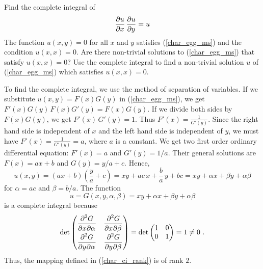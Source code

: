 \begin{egg}
Find the complete integral of
\begin{equation} \label{char_egg_ms}
\pdydx{u}{x}\,\pdydx{u}{y} = u
\end{equation}
The function $u(x,y)=0$ for all $x$ and $y$ satisfies
(\ref{char_egg_ms}) and the condition $u(x,x)=0$.  Are there
non-trivial solutions to (\ref{char_egg_ms}) that satisfy $u(x,x)=0$?
Use the complete integral to find a non-trivial solution $u$ of
(\ref{char_egg_ms}) which satisfies $u(x,x) = 0$.

To find the complete integral, we use the method of separation of
variables.  If we substitute $u(x,y) = F(x)G(y)$ in
(\ref{char_egg_ms}), we get $F'(x)G(y)\, F(x)G'(y) = F(x)G(y)$.  If
we divide both sides by $F(x)G(y)$, we get $F'(x) \, G'(y) = 1$. Thus
$\displaystyle F'(x) = \frac{1}{G'(y)}$.  Since the right hand side is
independent of $x$ and the left hand side is independent of $y$, we
must have $\displaystyle F'(x) = \frac{1}{G'(y)} = a$, where $a$ is a
constant.  We get two first order ordinary differential equation:
$F'(x)= a$ and $G'(y) = 1/a$.
Their general solutions are $F(x) = ax+b$ and $G(y) = y/a + c$.  Hence,
\[
u(x,y) = (ax+b)\left(\frac{y}{a} + c\right)
= xy + ac\, x + \frac{b}{a} \, y + bc
= xy + \alpha x + \beta y + \alpha \beta
\]
for $\alpha = ac$ and $\beta = b/a$.  The function
\[
u = G(x,y,\alpha,\beta) = xy + \alpha x + \beta y + \alpha \beta
\]
is a complete integral because
\[
\det
\begin{pmatrix}
\displaystyle \pdydxnm{G}{x}{\alpha}{2}{}{} &
\displaystyle \pdydxnm{G}{x}{\beta}{2}{}{} \\[0.7em]
\displaystyle \pdydxnm{G}{y}{\alpha}{2}{}{} &
\displaystyle \pdydxnm{G}{y}{\beta}{2}{}{}
\end{pmatrix}
= \det
\begin{pmatrix}
1 & 0 \\ 0 & 1
\end{pmatrix} = 1 \neq 0 \ .
\]
Thus, the mapping defined in (\ref{char_ci_rank}) is of rank $2$.


\end{egg}
